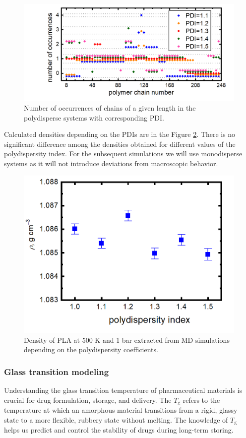 \begin{figure}[htb]
	\centering
	\includegraphics[width=1\hsize]{img/polydispersity_occurences_new.png}
	\caption{Number of occurrences of chains of a given length in the polydisperse systems with corresponding PDI.}
	\label{fig:polydisperzita_vyskyt}
\end{figure}       

Calculated densities depending on the PDIs are in the Figure \ref{fig:polydisperzita}. There is no significant difference among the densities obtained for different values of the polydispersity index. For the subsequent simulations we will use monodisperse systems as it will not introduce deviations from macroscopic behavior. 

\begin{figure}[htb]
	\centering
	\includegraphics[width=0.5\hsize]{img/polydisperzita_new.png}
	\caption{Density of PLA at 500 K and 1 bar extracted from MD simulations depending on the polydispersity coefficients.}
	\label{fig:polydisperzita}
\end{figure}       

\subsubsection{Glass transition modeling}
Understanding the glass transition temperature of pharmaceutical materials is crucial for drug formulation, storage, and delivery. The $T_\text{g}$ refers to the temperature at which an amorphous material transitions from a rigid, glassy state to a more flexible, rubbery state without melting. The knowledge of $T_\text{g}$ helps us predict and control the stability of drugs during long-term storing.  


